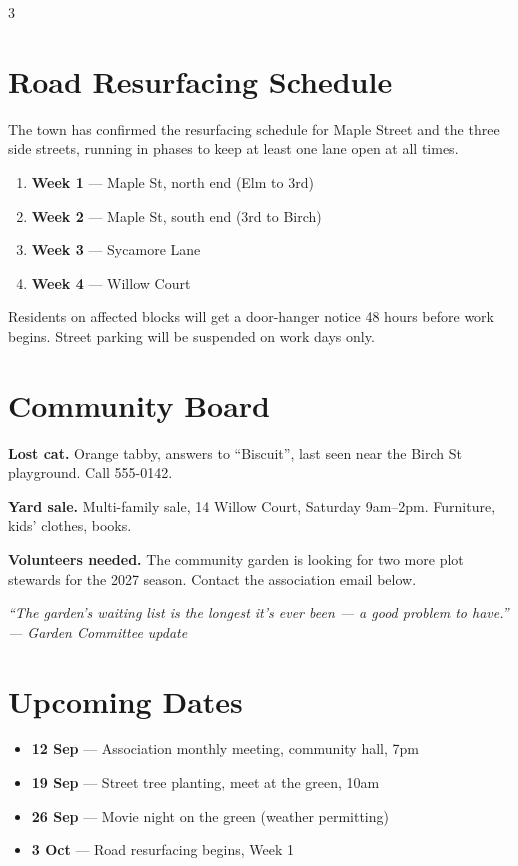 \documentclass[9pt]{extarticle}
\begin{document}
\begin{multicols}{3}

\section*{\normalsize Road Resurfacing Schedule}

The town has confirmed the resurfacing schedule for Maple Street and the
three side streets, running in phases to keep at least one lane open at all
times.

\begin{enumerate}[leftmargin=1.2em, itemsep=1pt]
  \item \textbf{Week 1} --- Maple St, north end (Elm to 3rd)
  \item \textbf{Week 2} --- Maple St, south end (3rd to Birch)
  \item \textbf{Week 3} --- Sycamore Lane
  \item \textbf{Week 4} --- Willow Court
\end{enumerate}

Residents on affected blocks will get a door-hanger notice 48 hours before
work begins. Street parking will be suspended on work days only.

\columnbreak

\section*{\normalsize Community Board}

\textbf{Lost cat.} Orange tabby, answers to ``Biscuit'', last seen near the
Birch St playground. Call 555-0142.

\textbf{Yard sale.} Multi-family sale, 14 Willow Court, Saturday 9am--2pm.
Furniture, kids' clothes, books.

\textbf{Volunteers needed.} The community garden is looking for two more
plot stewards for the 2027 season. Contact the association email below.

\bigskip
{\small\itshape
``The garden's waiting list is the longest it's ever been --- a good problem
to have.'' --- Garden Committee update
}

\columnbreak

\section*{\normalsize Upcoming Dates}

\begin{itemize}[leftmargin=1.1em, itemsep=1pt]
  \item \textbf{12 Sep} --- Association monthly meeting, community hall, 7pm
  \item \textbf{19 Sep} --- Street tree planting, meet at the green, 10am
  \item \textbf{26 Sep} --- Movie night on the green (weather permitting)
  \item \textbf{3 Oct} --- Road resurfacing begins, Week 1
\end{itemize}


\end{multicols}
\end{document}
